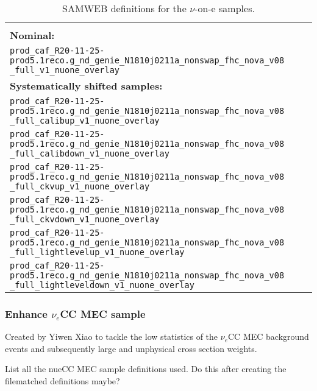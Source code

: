 \documentclass[12pt]{article}
\begin{document}
\begin{table}[!ht]
\centering
\begin{tabular}{p{\textwidth}}
\hline\hline\\
\textbf{Nominal:}\\
\texttt{prod\_caf\_R20-11-25-prod5.1reco.g\_nd\_genie\_N1810j0211a\_nonswap\_fhc\_nova\_v08} \texttt{\_full\_v1\_nuone\_overlay}\\[2mm]
\textbf{Systematically shifted samples:}\\
\texttt{prod\_caf\_R20-11-25-prod5.1reco.g\_nd\_genie\_N1810j0211a\_nonswap\_fhc\_nova\_v08} \texttt{\_full\_calibup\_v1\_nuone\_overlay}\\[2mm]
\texttt{prod\_caf\_R20-11-25-prod5.1reco.g\_nd\_genie\_N1810j0211a\_nonswap\_fhc\_nova\_v08} \texttt{\_full\_calibdown\_v1\_nuone\_overlay}\\[2mm]
\texttt{prod\_caf\_R20-11-25-prod5.1reco.g\_nd\_genie\_N1810j0211a\_nonswap\_fhc\_nova\_v08} \texttt{\_full\_ckvup\_v1\_nuone\_overlay}\\[2mm]
\texttt{prod\_caf\_R20-11-25-prod5.1reco.g\_nd\_genie\_N1810j0211a\_nonswap\_fhc\_nova\_v08} \texttt{\_full\_ckvdown\_v1\_nuone\_overlay}\\[2mm]
\texttt{prod\_caf\_R20-11-25-prod5.1reco.g\_nd\_genie\_N1810j0211a\_nonswap\_fhc\_nova\_v08} \texttt{\_full\_lightlevelup\_v1\_nuone\_overlay}\\[2mm]
\texttt{prod\_caf\_R20-11-25-prod5.1reco.g\_nd\_genie\_N1810j0211a\_nonswap\_fhc\_nova\_v08} \texttt{\_full\_lightleveldown\_v1\_nuone\_overlay}\\[2mm]
\hline\hline
\end{tabular}
\caption{SAMWEB definitions for the $\nu$-on-e samples.}
\label{tab:NuoneDefinitions}
\end{table}

\subsubsection*{Enhance $\nu_e$CC MEC sample}
Created by Yiwen Xiao \cite{NOVA-doc-56383} to tackle the low statistics of the $\nu_e$CC MEC background events and subsequently large and unphysical cross section weights.

List all the nueCC MEC sample definitions used. Do this after creating the filematched definitions maybe?
\end{document}
